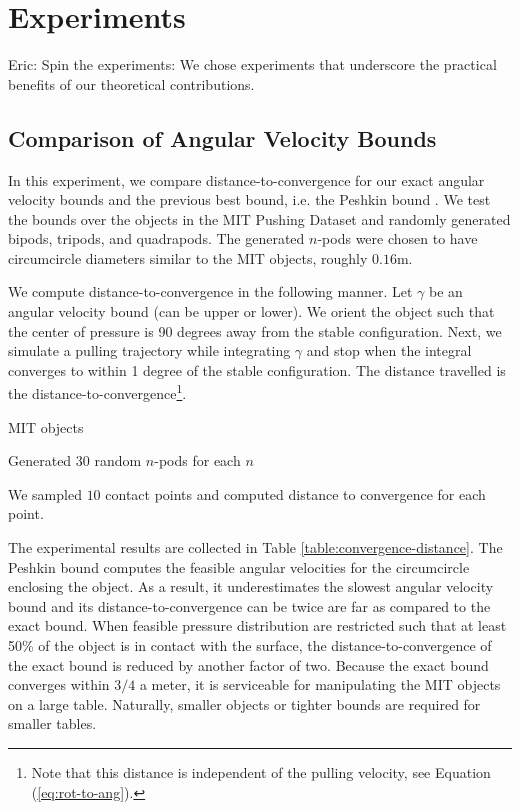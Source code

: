 \documentclass[conference]{IEEEtran}
\newcommand{\EH}[1]{{\color{blue} {Eric: {#1}}  }}
\begin{document}
\section{Experiments}\label{sec:experiments}
\EH{Spin the experiments: We chose experiments that underscore the
  practical benefits of our theoretical contributions.}

\subsection{Comparison of
  Angular Velocity Bounds}\label{sec:bound-comparison}

In this experiment, we compare distance-to-convergence for our exact
angular velocity bounds and the previous best bound, i.e. the Peshkin
bound \cite{peshkin1988motion}. We test the bounds over the objects in
the MIT Pushing Dataset \cite{YuBFR16} and randomly generated bipods,
tripods, and quadrapods. The generated $n$-pods were chosen to have
circumcircle diameters similar to the MIT objects, roughly $0.16$m.

We compute distance-to-convergence in the following manner. Let
$\gamma$ be an angular velocity bound (can be upper or lower). We
orient the object such that the center of pressure is 90 degrees away
from the stable configuration. Next, we simulate a pulling trajectory
while integrating $\gamma$ and stop when the integral converges to
within 1 degree of the stable configuration. The distance travelled is
the distance-to-convergence\footnote{Note that this distance is
  independent of the pulling velocity, see Equation
  (\ref{eq:rot-to-ang}).}.

\begin{inparaenum}
\item MIT objects
\item Generated 30 random $n$-pods for each $n$
\item We sampled $10$ contact points and computed distance to
  convergence for each point.
\end{inparaenum}

The experimental results are collected in Table
\ref{table:convergence-distance}. 
The Peshkin bound computes the feasible angular velocities for the
circumcircle enclosing the object. As a result, it underestimates the
slowest angular velocity bound and its distance-to-convergence can be
twice are far as compared to the exact bound.  When feasible pressure
distribution are restricted such that at least 50\% of the object is
in contact with the surface, the distance-to-convergence of the exact
bound is reduced by another factor of two. Because the exact bound
converges within $3/4$ a meter, it is serviceable for manipulating the
MIT objects on a large table. Naturally, smaller objects or tighter
bounds are required for smaller tables.
\end{document}
